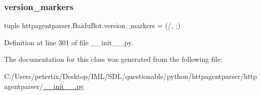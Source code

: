 \subsubsection{\texorpdfstring{version\+\_\+markers}{version\_markers}}
{\footnotesize\ttfamily tuple httpagentparser.\+Baidu\+Bot.\+version\+\_\+markers = (\textquotesingle{}/\textquotesingle{}, \textquotesingle{};\textquotesingle{})\hspace{0.3cm}{\ttfamily [static]}}



Definition at line 301 of file \+\_\+\+\_\+init\+\_\+\+\_\+.\+py.



The documentation for this class was generated from the following file\+:\begin{DoxyCompactItemize}
\item 
C\+:/\+Users/petertix/\+Desktop/\+I\+M\+L/\+S\+D\+L/questionable/python/httpagentparser/httpagentparser/\hyperlink{____init_____8py}{\+\_\+\+\_\+init\+\_\+\+\_\+.\+py}\end{DoxyCompactItemize}
